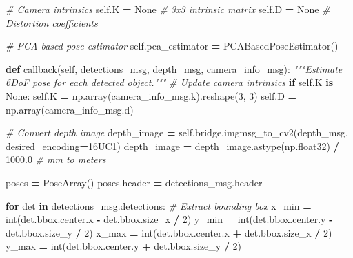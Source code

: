 \documentclass[
]{article}
\newenvironment{Shaded}{\begin{snugshade}}{\end{snugshade}}
\newcommand{\BuiltInTok}[1]{#1}
\newcommand{\CommentTok}[1]{\textcolor[rgb]{0.56,0.35,0.01}{\textit{#1}}}
\newcommand{\ControlFlowTok}[1]{\textcolor[rgb]{0.13,0.29,0.53}{\textbf{#1}}}
\newcommand{\DecValTok}[1]{\textcolor[rgb]{0.00,0.00,0.81}{#1}}
\newcommand{\FloatTok}[1]{\textcolor[rgb]{0.00,0.00,0.81}{#1}}
\newcommand{\KeywordTok}[1]{\textcolor[rgb]{0.13,0.29,0.53}{\textbf{#1}}}
\newcommand{\NormalTok}[1]{#1}
\newcommand{\OperatorTok}[1]{\textcolor[rgb]{0.81,0.36,0.00}{\textbf{#1}}}
\newcommand{\StringTok}[1]{\textcolor[rgb]{0.31,0.60,0.02}{#1}}
\newcommand{\VariableTok}[1]{\textcolor[rgb]{0.00,0.00,0.00}{#1}}
\begin{document}
\begin{Shaded}
\begin{Highlighting}[]
        \CommentTok{\# Camera intrinsics}
        \VariableTok{self}\NormalTok{.K }\OperatorTok{=} \VariableTok{None}  \CommentTok{\# 3x3 intrinsic matrix}
        \VariableTok{self}\NormalTok{.D }\OperatorTok{=} \VariableTok{None}  \CommentTok{\# Distortion coefficients}

        \CommentTok{\# PCA{-}based pose estimator}
        \VariableTok{self}\NormalTok{.pca\_estimator }\OperatorTok{=}\NormalTok{ PCABasedPoseEstimator()}

    \KeywordTok{def}\NormalTok{ callback(}\VariableTok{self}\NormalTok{, detections\_msg, depth\_msg, camera\_info\_msg):}
        \CommentTok{"""Estimate 6DoF pose for each detected object."""}
        \CommentTok{\# Update camera intrinsics}
        \ControlFlowTok{if} \VariableTok{self}\NormalTok{.K }\KeywordTok{is} \VariableTok{None}\NormalTok{:}
            \VariableTok{self}\NormalTok{.K }\OperatorTok{=}\NormalTok{ np.array(camera\_info\_msg.k).reshape(}\DecValTok{3}\NormalTok{, }\DecValTok{3}\NormalTok{)}
            \VariableTok{self}\NormalTok{.D }\OperatorTok{=}\NormalTok{ np.array(camera\_info\_msg.d)}

        \CommentTok{\# Convert depth image}
\NormalTok{        depth\_image }\OperatorTok{=} \VariableTok{self}\NormalTok{.bridge.imgmsg\_to\_cv2(depth\_msg, desired\_encoding}\OperatorTok{=}\StringTok{\textquotesingle{}16UC1\textquotesingle{}}\NormalTok{)}
\NormalTok{        depth\_image }\OperatorTok{=}\NormalTok{ depth\_image.astype(np.float32) }\OperatorTok{/} \FloatTok{1000.0}  \CommentTok{\# mm to meters}

\NormalTok{        poses }\OperatorTok{=}\NormalTok{ PoseArray()}
\NormalTok{        poses.header }\OperatorTok{=}\NormalTok{ detections\_msg.header}

        \ControlFlowTok{for}\NormalTok{ det }\KeywordTok{in}\NormalTok{ detections\_msg.detections:}
            \CommentTok{\# Extract bounding box}
\NormalTok{            x\_min }\OperatorTok{=} \BuiltInTok{int}\NormalTok{(det.bbox.center.x }\OperatorTok{{-}}\NormalTok{ det.bbox.size\_x }\OperatorTok{/} \DecValTok{2}\NormalTok{)}
\NormalTok{            y\_min }\OperatorTok{=} \BuiltInTok{int}\NormalTok{(det.bbox.center.y }\OperatorTok{{-}}\NormalTok{ det.bbox.size\_y }\OperatorTok{/} \DecValTok{2}\NormalTok{)}
\NormalTok{            x\_max }\OperatorTok{=} \BuiltInTok{int}\NormalTok{(det.bbox.center.x }\OperatorTok{+}\NormalTok{ det.bbox.size\_x }\OperatorTok{/} \DecValTok{2}\NormalTok{)}
\NormalTok{            y\_max }\OperatorTok{=} \BuiltInTok{int}\NormalTok{(det.bbox.center.y }\OperatorTok{+}\NormalTok{ det.bbox.size\_y }\OperatorTok{/} \DecValTok{2}\NormalTok{)}


\end{Highlighting}
\end{Shaded}
\end{document}
